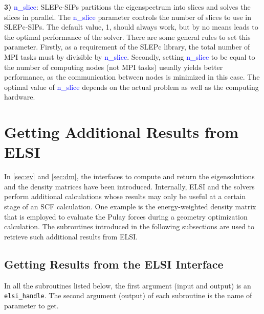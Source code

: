 \documentclass{report}
\begin{document}
\textbf{3)} \textcolor{blue}{n\_slice}:  SLEPc-SIPs partitions the eigenspectrum into slices and solves the slices in parallel.  The \textcolor{blue}{n\_slice} parameter controls the number of slices to use in SLEPc-SIPs.  The default value, 1, should always work, but by no means leads to the optimal performance of the solver.  There are some general rules to set this parameter.  Firstly, as a requirement of the SLEPc library, the total number of MPI tasks must by divisible by \textcolor{blue}{n\_slice}.  Secondly, setting \textcolor{blue}{n\_slice} to be equal to the number of computing nodes (not MPI tasks) usually yields better performance, as the communication between nodes is minimized in this case.  The optimal value of \textcolor{blue}{n\_slice} depends on the actual problem as well as the computing hardware.\\

\section{Getting Additional Results from ELSI}
\label{sec:getter}
In \ref{sec:ev} and \ref{sec:dm}, the interfaces to compute and return the eigensolutions and the density matrices have been introduced.  Internally, ELSI and the solvers perform additional calculations whose results may only be useful at a certain stage of an SCF calculation.  One example is the energy-weighted density matrix that is employed to evaluate the Pulay forces during a geometry optimization calculation.  The subroutines introduced in the following subsections are used to retrieve such additional results from ELSI.\\

\subsection{Getting Results from the ELSI Interface}
\label{subsec:getter_elsi}
In all the subroutines listed below, the first argument (input and output) is an \texttt{elsi\_handle}.  The second argument (output) of each subroutine is the name of parameter to get.\\
\end{document}
